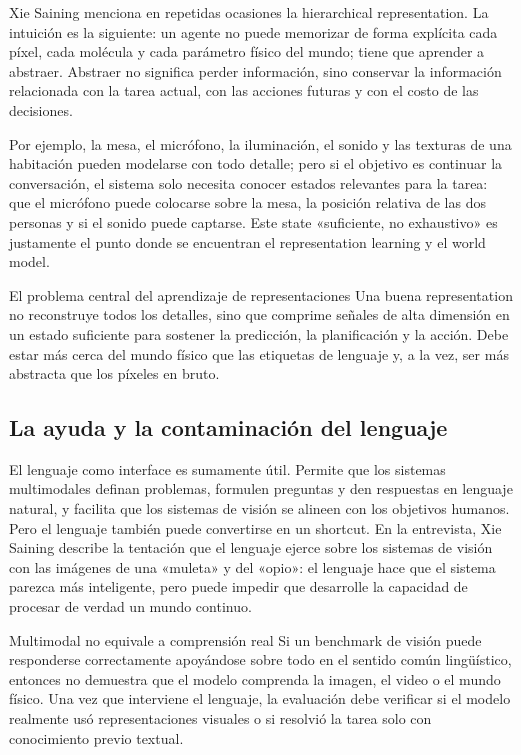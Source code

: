 \documentclass[a4paper]{article}
\begin{document}
Xie Saining menciona en repetidas ocasiones la hierarchical representation. La intuición es la siguiente: un agente no puede memorizar de forma explícita cada píxel, cada molécula y cada parámetro físico del mundo; tiene que aprender a abstraer. Abstraer no significa perder información, sino conservar la información relacionada con la tarea actual, con las acciones futuras y con el costo de las decisiones.

Por ejemplo, la mesa, el micrófono, la iluminación, el sonido y las texturas de una habitación pueden modelarse con todo detalle; pero si el objetivo es continuar la conversación, el sistema solo necesita conocer estados relevantes para la tarea: que el micrófono puede colocarse sobre la mesa, la posición relativa de las dos personas y si el sonido puede captarse. Este state «suficiente, no exhaustivo» es justamente el punto donde se encuentran el representation learning y el world model.

\begin{importantbox}{El problema central del aprendizaje de representaciones}
Una buena representation no reconstruye todos los detalles, sino que comprime señales de alta dimensión en un estado suficiente para sostener la predicción, la planificación y la acción. Debe estar más cerca del mundo físico que las etiquetas de lenguaje y, a la vez, ser más abstracta que los píxeles en bruto.
\end{importantbox}

\subsection{La ayuda y la contaminación del lenguaje}

El lenguaje como interface es sumamente útil. Permite que los sistemas multimodales definan problemas, formulen preguntas y den respuestas en lenguaje natural, y facilita que los sistemas de visión se alineen con los objetivos humanos. Pero el lenguaje también puede convertirse en un shortcut. En la entrevista, Xie Saining describe la tentación que el lenguaje ejerce sobre los sistemas de visión con las imágenes de una «muleta» y del «opio»: el lenguaje hace que el sistema parezca más inteligente, pero puede impedir que desarrolle la capacidad de procesar de verdad un mundo continuo.

\begin{warningbox}{Multimodal no equivale a comprensión real}
Si un benchmark de visión puede responderse correctamente apoyándose sobre todo en el sentido común lingüístico, entonces no demuestra que el modelo comprenda la imagen, el video o el mundo físico. Una vez que interviene el lenguaje, la evaluación debe verificar si el modelo realmente usó representaciones visuales o si resolvió la tarea solo con conocimiento previo textual.
\end{warningbox}
\end{document}
